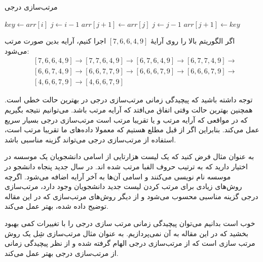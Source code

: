 \documentclass[12pt]{article}
\begin{document}
\begin{algorithm}[H]
  \caption{مرتب‌سازی درجی}
  \begin{latin}
    \begin{algorithmic}[1]
      \State $key \gets arr[i]$
      \State $j \gets i-1$
      \State $arr[j+1] \gets arr[j]$
      \State $j \gets j - 1$
      \EndWhile
      \State $arr[j+1] \gets key$
      \EndFor
      \EndProcedure
    \end{algorithmic}
  \end{latin}
  \label{alg:a1}
\end{algorithm}

اگر الگوریتم بالا را روی آرایهٔ
$[7, 6, 6, 4, 9]$
اجرا کنیم،
آرایه بدین صورت مرتب می‌شود:
\begin{align*}
   & [7, 6, 6, 4, 9] \rightarrow [7, 7, 6, 4, 9] \rightarrow
  [6, 7, 6, 4, 9] \rightarrow [6, 7, 7, 4, 9] \rightarrow    \\
   & [6, 6, 7, 4, 9] \rightarrow [6, 6, 7, 7, 9] \rightarrow
  [6, 6, 6, 7, 9] \rightarrow [6, 6, 6, 7, 9]  \rightarrow   \\
   & [4, 6, 6, 7, 9] \rightarrow [4, 6, 6, 7, 9]
\end{align*}

توجه داشته باشید که پیچیدگی زمانی مرتب‌سازی درجی در بهترین حالت خطی است.
همچنین بهترین حالت وقتی اتفاق می‌افتد که آرایه مرتب باشد.
می‌توانیم نتیجه بگیریم که در مواقعی که آرایه مرتب و یا تقریبا مرتب است
مرتب‌سازی درجی بسیار سریع عمل می‌کند.
بنابراین اگر از قبل مطلع هستیم که معمولا داده‌های ما تقریبا مرتب است، استفاده از مرتب‌سازی درجی
می‌تواند گزینه مناسبی باشد.

به عنوان مثال فرض کنید که یک لیست هزارتایی از اسامی دانشجویان یک موسسه در اختیار دارید که به ترتیب حروف الفبا مرتب شده اند.
در سال جدید پنجاه دانشجو در موسسه نام نویسی می‌کنند و اسامی آن‌ها به آخر آرایه اضافه می‌شود.
اگرچه روش‌های زیادی برای مرتب کردن لیست جدید دانشجویان وجود دارد، مرتب‌سازی درجی گزینه مناسبی محسوب می‌شود
و از دیگر روش‌های مرتب‌سازی که در این مقاله توضیح داده شده، بهتر عمل می‌کند.

خوب است بدانیم
می‌توان پیچیدگی زمانی مرتب سازی درجی را با تغییرات کمی بهبود بخشید
که در این مقاله به آن نمی‌پردازیم.
به عنوان مثال مرتب‌سازی شِل
یک روش مرتب سازی است که از مرتب‌سازی درجی الهام گرفته شده
و از نظر پیچیدگی زمانی از مرتب‌سازی درجی بهتر عمل می‌کند.
\cite{shell1}
\cite{shell2}

{
\fontsize{12pt}{10pt}\selectfont


}
\end{document}
